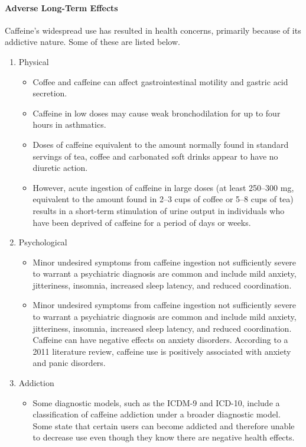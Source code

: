\documentclass[11pt]{article}
\begin{document}
\paragraph{Adverse Long-Term Effects \cite{effects}} Caffeine's widespread use has resulted in health concerns, primarily
because of its addictive nature. Some of these are listed below.
\begin{enumerate}
  \item{Physical}
    \begin{itemize}
      \item Coffee and caffeine can affect gastrointestinal motility and gastric acid secretion.
      \item Caffeine in low doses may cause weak bronchodilation for up to four hours in asthmatics.
      \item Doses of caffeine equivalent to the amount normally found in standard servings of tea,
        coffee and carbonated soft drinks appear to have no diuretic action.
      \item  However, acute ingestion of caffeine in large doses (at least 250–300 mg, equivalent to
        the amount found in 2–3 cups of coffee or 5–8 cups of tea) results in a short-term
        stimulation of urine output in individuals who have been deprived of caffeine for a period
        of days or weeks.\cite{Maughan2003CaffeineIA}
    \end{itemize}
  \item{Psychological}
    \begin{itemize}
      \item Minor undesired symptoms from caffeine ingestion not sufficiently severe to warrant a
        psychiatric diagnosis are common and include mild anxiety, jitteriness, insomnia, increased
        sleep latency, and reduced coordination.
      \item Minor undesired symptoms from caffeine ingestion not sufficiently severe to warrant a
        psychiatric diagnosis are common and include mild anxiety, jitteriness, insomnia, increased
        sleep latency, and reduced coordination. Caffeine can have negative effects on
        anxiety disorders. According to a 2011 literature review,
        caffeine use is positively associated with anxiety and panic disorders.\cite{Vilarim2011CaffeineCT}
    \end{itemize}
  \item{Addiction}
    \begin{itemize}
      \item  Some diagnostic models, such as the ICDM-9 and ICD-10, include a classification of
      caffeine addiction under a broader diagnostic model. Some state that certain users can become
      addicted and therefore unable to decrease use even though they know there are negative health
      effects.
    \end{itemize}
\end{enumerate}
\end{document}
